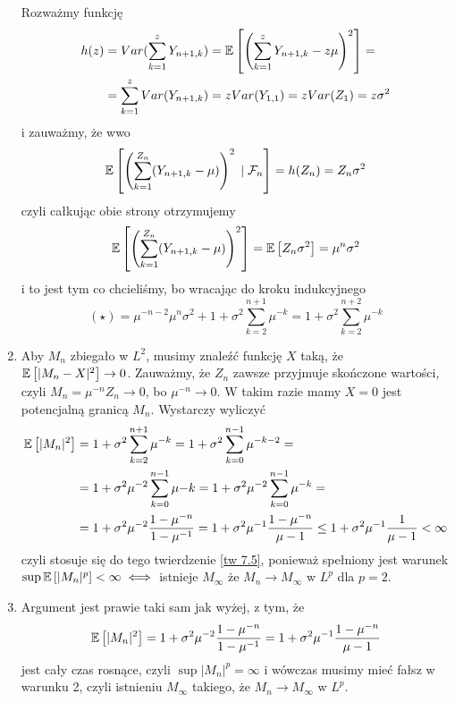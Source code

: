\begin{solution}
\begin{enumerate}[label=(\alph*)]
      Rozważmy funkcję 
      \begin{align*}
        h(z)&=Var(\sum_{k=1}^zY_{n+1,k})=\expected{\left(\sum_{k=1}^zY_{n+1,k}-z\mu\right)^2}=\\ 
            &=\sum_{k=1}^zVar(Y_{n+1,k})=zVar(Y_{1,1})=zVar(Z_1)=z\sigma^2
      \end{align*}
      i zauważmy, że wwo
      $$\expected{\left(\sum_{k=1}^{Z_n}(Y_{n+1,k}-\mu)\right)^2}{\set{F}_n}=h(Z_n)=Z_n\sigma^2$$
      czyli całkując obie strony otrzymujemy
      $$\expected{\left(\sum_{k=1}^{Z_n}(Y_{n+1,k}-\mu)\right)^2}=\expected{Z_n\sigma^2}=\mu^n\sigma^2$$
      i to jest tym co chcieliśmy, bo wracając do kroku indukcyjnego
      $$(\star)=\mu^{-n-2}\mu^n \sigma^2+1+\sigma^2\sum_{k=2}^{n+1}\mu^{-k}=1+\sigma^2\sum_{k=2}^{n+2}\mu^{-k}$$
    \item Aby $M_n$ zbiegało w $L^2$, musimy znaleźć funkcję $X$ taką, że $\expected{|M_n-X|^2}\to 0$. Zauważmy, że $Z_n$ zawsze przyjmuje skończone wartości, czyli $M_n=\mu^{-n}Z_n\to 0$, bo $\mu^{-n}\to 0$. W takim razie mamy $X=0$ jest potencjalną granicą $M_n$. Wystarczy wyliczyć
      \begin{align*}
        \expected{|M_n|^2}&=1+\sigma^2\sum_{k=2}^{n+1}\mu^{-k}=1+\sigma^2\sum_{k=0}^{n-1}\mu^{-k-2}=\\ 
                          &=1+\sigma^2\mu^{-2}\sum_{k=0}^{n-1}\mu{-k}=1+\sigma^2\mu^{-2}\sum_{k=0}^{n-1}\mu^{-k}=\\ 
                          &=1+\sigma^2\mu^{-2}\frac{1-\mu^{-n}}{1-\mu^{-1}}=1+\sigma^2\mu^{-1}\frac{1-\mu^{-n}}{\mu-1}\leq 1+\sigma^2\mu^{-1}\frac{1}{\mu-1}<\infty
      \end{align*}
      czyli stosuje się do tego twierdzenie \ref{tw 7.5}, ponieważ spełniony jest warunek $\sup\expected{|M_n|^p}<\infty\iff$ istnieje $M_\infty$ że $M_n\to M_\infty$ w $L^p$ dla $p=2$.
    \item Argument jest prawie taki sam jak wyżej, z tym, że
      $$\expected{|M_n|^2}=1+\sigma^2\mu^{-2}\frac{1-\mu^{-n}}{1-\mu^{-1}}=1+\sigma^2\mu^{-1}\frac{1-\mu^{-n}}{\mu-1}$$
      jest cały czas rosnące, czyli $\sup{|M_n|^p}=\infty$ i wówczas musimy mieć fałsz w warunku 2, czyli istnieniu $M_\infty$ takiego, że $M_n\to M_\infty$ w $L^p$.
  \end{enumerate}
\end{solution}
